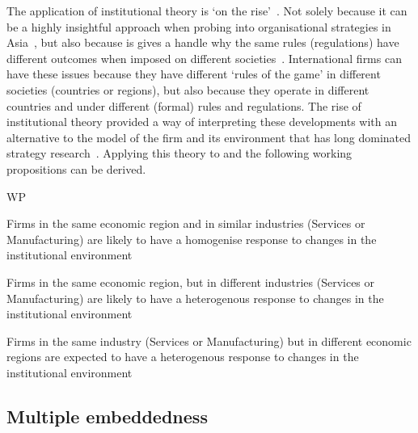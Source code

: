 The application of institutional theory is `on the rise'~\citep{Westney:2011ih}.
Not solely because it can be a highly insightful approach when probing into organisational strategies in Asia~\citep{Hoskisson:2000wd}, but also because is gives a handle why the same rules (regulations) have different outcomes when imposed on different societies~\citep{North:1990vl}.
International firms can have these issues because they have different `rules of the game' in different societies (countries or regions), but also because they operate in different countries and under different (formal) rules and regulations. 
The rise of institutional theory provided a way of interpreting these developments with an alternative to the model of the firm and its environment that has long dominated strategy research~\citep{Westney:2011ih}.
Applying this theory to  and  the following working propositions can be derived.

\begin{subtheorem}{WP} 
\begin{WP}\label{wp:same_same}
Firms in the same economic region and in similar industries (Services or Manufacturing) are likely to have a homogenise response to changes in the institutional environment%
\end{WP}
\begin{WP}\label{wp:same_Eco_Diff_Ind}
Firms in the same economic region, but in different industries (Services or Manufacturing) are likely to have a heterogenous response to changes in the institutional environment%
\end{WP}
\begin{WP}\label{wp:same_Ind_Diff_Eco}
Firms in the same industry (Services or Manufacturing) but in different economic regions are expected to have a heterogenous response to changes in the institutional environment%
\end{WP}
\end{subtheorem}

\subsection{Multiple embeddedness}

